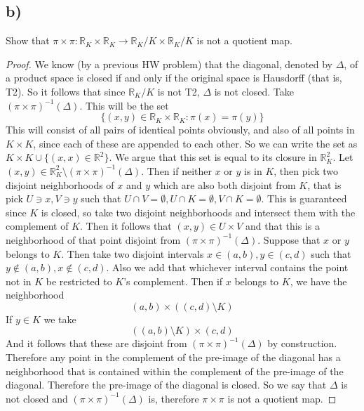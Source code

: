 \documentclass{article}
\theoremstyle{definition}
\begin{document}
\subsection*{b)}
\begin{mdframed}
    Show that $\pi \times \pi : \mathbb{R}_K \times \mathbb{R}_K \rightarrow \mathbb{R}_K / K \times \mathbb{R}_K / K$ is not a quotient map.
\end{mdframed}
\begin{proof}
    We know (by a previous HW problem) that the diagonal, denoted by $\Delta$, of a product space is closed if and only if the original space is Hausdorff (that is, T2).
    So it follows that since $\mathbb{R}_K / K$ is not T2, $\Delta$ is not closed. Take $(\pi \times \pi)^{-1}(\Delta)$. This will be the set 
    \[
        \{(x,y) \in \mathbb{R}_K \times \mathbb{R}_K : \pi(x) = \pi(y)\}
    \]
    This will consist of all pairs of identical points obviously, and also of all points in $K \times K$, since each of these are appended to each other.
    So we can write the set as $K \times K \cup \{(x,x) \in \mathbb{R}^2\}$. We argue that this set is equal to its closure in $\mathbb{R}_K^2$. Let $(x,y) \in \mathbb{R}_K^2 \setminus (\pi \times \pi)^{-1}(\Delta)$.
    Then if neither $x$ or $y$ is in $K$, then pick two disjoint neighborhoods of $x$ and $y$ which are also both disjoint from $K$, that is pick $U \ni x, V \ni y$ such that 
    $U \cap V = \emptyset, U \cap K = \emptyset, V \cap K = \emptyset$.
    This is guaranteed since $K$ is closed, so take two disjoint neighborhoods and intersect them with the complement of $K$.
    Then it follows that $(x,y) \in U \times V$ and that this is a neighborhood of that point disjoint from $(\pi \times \pi)^{-1}(\Delta)$.
    Suppose that $x$ or $y$ belongs to $K$. Then take two disjoint intervals $x \in (a,b), y \in (c,d)$ such that $y \notin (a,b), x \notin(c,d)$.
    Also we add that whichever interval contains the point not in $K$ be restricted to $K$'s complement.
    Then if $x$ belongs to $K$, we have the neighborhood \[(a,b) \times ((c,d) \setminus K)\] If $y \in K$ we take
    \[
        ((a,b) \setminus K) \times (c,d)
        \]
    And it follows that these are disjoint from $(\pi \times \pi)^{-1}(\Delta)$ by construction. Therefore any point in the complement of the pre-image of
    the diagonal has a neighborhood that is contained within the complement of the pre-image of the diagonal. Therefore the pre-image of the diagonal is closed.
    So we say that $\Delta$ is not closed and $(\pi \times \pi)^{-1}(\Delta)$ is, therefore $\pi \times \pi$ is not a quotient map.
\end{proof}
\end{document}
